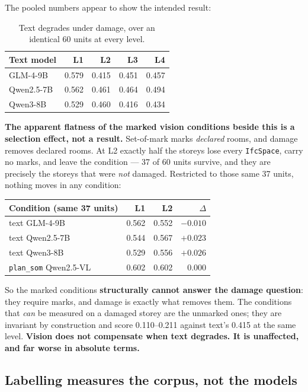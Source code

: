 \documentclass[11pt,a4paper]{article}
\newcommand{\code}[1]{\texttt{\small #1}}
\begin{document}
\noindent
The pooled numbers appear to show the intended result:

\begin{table}[ht]
\centering
\small
\begin{tabular}{lrrrr}
\toprule
Text model & L1 & L2 & L3 & L4 \\
\midrule
GLM-4-9B   & 0.579 & 0.415 & 0.451 & 0.457 \\
Qwen2.5-7B & 0.562 & 0.461 & 0.464 & 0.494 \\
Qwen3-8B   & 0.529 & 0.460 & 0.416 & 0.434 \\
\bottomrule
\end{tabular}
\caption{Text degrades under damage, over an identical 60 units at every level.}
\end{table}

\noindent
\textbf{The apparent flatness of the marked vision conditions beside this is a
selection effect, not a result.} Set-of-mark marks \emph{declared} rooms, and
damage removes declared rooms. At L2 exactly half the storeys lose every
\code{IfcSpace}, carry no marks, and leave the condition --- 37 of 60 units
survive, and they are precisely the storeys that were \emph{not} damaged.
Restricted to those same 37 units, nothing moves in any condition:

\begin{table}[ht]
\centering
\small
\begin{tabular}{lrrr}
\toprule
Condition (same 37 units) & L1 & L2 & $\Delta$ \\
\midrule
text GLM-4-9B          & 0.562 & 0.552 & $-0.010$ \\
text Qwen2.5-7B        & 0.544 & 0.567 & $+0.023$ \\
text Qwen3-8B          & 0.529 & 0.556 & $+0.026$ \\
\code{plan\_som} Qwen2.5-VL & 0.602 & 0.602 & $0.000$ \\
\bottomrule
\end{tabular}
\end{table}

\noindent
So the marked conditions \textbf{structurally cannot answer the damage
question}: they require marks, and damage is exactly what removes them. The
conditions that \emph{can} be measured on a damaged storey are the unmarked
ones; they are invariant by construction and score 0.110--0.211 against text's
0.415 at the same level. \textbf{Vision does not compensate when text degrades.
It is unaffected, and far worse in absolute terms.}

\subsection{Labelling measures the corpus, not the models}
\end{document}
